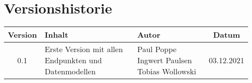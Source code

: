 \chapter*{Versionshistorie}
\begin{table}[htb]
	\begin{tabularx}{\textwidth}{|c|X|l|c|}
		\hline
\textbf{Version} & \textbf{Inhalt} & \textbf{Autor} & \textbf{Datum} \\ \hline
0.1 & Erste Version mit allen Endpunkten und Datenmodellen & Paul Poppe \newline Ingwert Paulsen \newline Tobias Wollowski & 03.12.2021 \\ \hline

	\end{tabularx}
\end{table}
